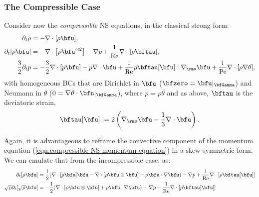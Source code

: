 \subsubsection*{The Compressible Case}
    Consider now the \emph{compressible} NS equations, in the classical strong form:
    \begin{align}
                \partial_{t}\rho  &=  - \nabla\cdot[\rho\bfu],  \label{eqn:compressible NS mass equation}  \\
          \partial_{t}[\rho\bfu]  &=  - \nabla\cdot\left[\rho\bfu^{\otimes 2}\right] - \nabla p + \frac{1}{\rmRe}\nabla\cdot[\rho\bftau],  \label{eqn:compressible NS momentum equation}  \\
        \frac{3}{2}\partial_{t}p  &=  - \frac{3}{2}\nabla\cdot[p\bfu] - p\nabla\cdot\bfu + \frac{1}{\rmRe}\rho\bftau[\bfu]:\nabla_{\rms}\bfu + \frac{1}{\rmPe}\nabla\cdot[\rho\nabla\theta],  \label{eqn:compressible NS energy equation}
    \end{align}
    with homogeneous BCs that are Dirichlet in $\bfu$ ($\bfzero  =  \bfu|_{\bfGamma}$) and Neumann in $\theta$ ($0  =  \nabla\theta\cdot\bfn|_{\bfGamma}$), where $p = \rho\theta$ and as above, $\bftau$ is the deviatoric strain,
    \begin{equation}
        \bftau[\bfu]  :=  2\left(\nabla_{\rms}\bfu - \frac{1}{3}\nabla\cdot\bfu\right).
    \end{equation}

    Again, it is advantageous to reframe the convective component of the momentum equation (\ref{eqn:compressible NS momentum equation}) in a skew-symmetric form. We can emulate that from the incompressible case, as:
    \begin{align}
        \partial_{t}[\rho\bfu]  &=  \frac{1}{2}(\nabla\cdot[\rho\bfu]\bfu - \nabla\cdot\left[\rho\bfu\otimes\bfu\right] - \rho\bfu\cdot\nabla\bfu) - \nabla p + \frac{1}{\rmRe}\nabla\cdot[\rho\bftau[\bfu]]  \\
        \sqrt{\rho}\partial_{t}[\sqrt{\rho}\bfu]  &=  - \frac{1}{2}(\nabla\cdot\left[\rho\bfu\otimes\bfu\right] + \rho\bfu\cdot\nabla\bfu) - \nabla p + \frac{1}{\rmRe}\nabla\cdot[\rho\bftau[\bfu]]  \label{eqn:compressible NS skew-symmetric momentum equation}  \\  
    \end{align}

